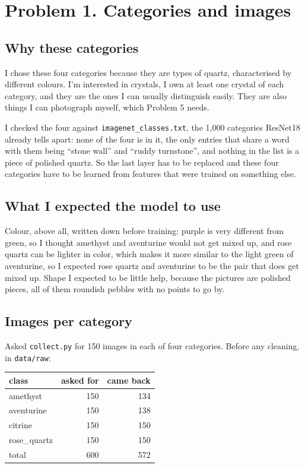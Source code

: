 \documentclass[11pt]{article}
\begin{document}
\makeheader

\section*{Problem 1. Categories and images}

\subsection*{Why these categories}
I chose these four categories because they are types of quartz, characterised
by different colours. I'm interested in crystals, I own at least one crystal of
each category, and they are the ones I can usually distinguish easily.
They are also things I can photograph myself, which Problem 5 needs.

I checked the four against \texttt{imagenet\_classes.txt}, the 1,000 categories
ResNet18 already tells apart: none of the four is in it, the only entries that
share a word with them being ``stone wall'' and ``ruddy turnstone'', and nothing in
the list is a piece of polished quartz. So the last layer has to be replaced
and these four categories have to be learned from features that were trained on
something else.

\subsection*{What I expected the model to use}
Colour, above all, written down before training: purple is very different from
green, so I thought amethyst and aventurine would not get mixed up, and rose
quartz can be lighter in color, which makes it more similar to the light green
of aventurine, so I expected rose quartz and aventurine to be the pair that
does get mixed up. Shape I expected to be little help, because the pictures are
polished pieces, all of them roundish pebbles with no points to go by.

\subsection*{Images per category}
Asked \texttt{collect.py} for 150 images in each of four categories. Before any
cleaning, in \texttt{data/raw}:

\begin{center}\footnotesize
\begin{tabular}{lrr}
\toprule
class & asked for & came back \\
\midrule
amethyst & 150 & 134 \\
aventurine & 150 & 138 \\
citrine & 150 & 150 \\
rose\_quartz & 150 & 150 \\
\midrule
total & 600 & 572 \\
\bottomrule
\end{tabular}
\end{center}
\end{document}
